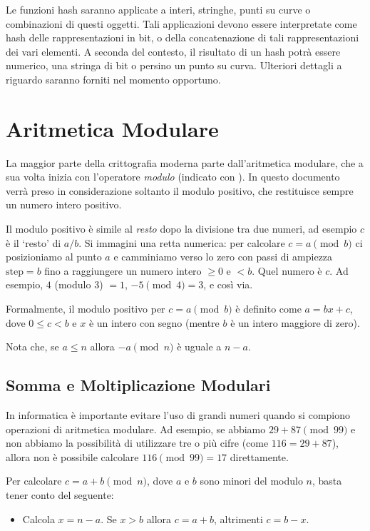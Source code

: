 Le funzioni hash saranno applicate a interi, stringhe, punti su curve o combinazioni di questi oggetti. Tali applicazioni devono essere interpretate come hash delle rappresentazioni in bit, o della concatenazione di tali rappresentazioni dei vari elementi. A seconda del contesto, il risultato di un hash potrà essere numerico, una stringa di bit o persino un punto su curva. Ulteriori dettagli a riguardo saranno forniti nel momento opportuno.



\section{Aritmetica Modulare}
\label{sec:modular-arithmetic}

La maggior parte della crittografia moderna parte dall'aritmetica modulare, che a sua volta inizia con l'operatore \emph{modulo} (indicato con ). In questo documento verrà preso in considerazione soltanto il modulo positivo, che restituisce sempre un numero intero positivo.

Il modulo positivo è simile al \emph{resto} dopo la divisione tra due numeri, ad esempio $c$ è il `resto' di $a/b$. Si immagini una retta numerica: per calcolare $c = a \pmod b$ ci posizioniamo al punto $a$ e camminiamo verso lo zero con passi di ampiezza $\text{step} = b$ fino a raggiungere un numero intero $\geq{0}$ e $<b$. Quel numero è $c$. Ad esempio, $4$ (modulo 3) $= 1$, $-5 \pmod 4 = 3$, e così via.

Formalmente, il modulo positivo per $c = a \pmod b$ è definito come $a=bx+c$, dove $0\leq{c}<{b}$ e $x$ è un intero con segno (mentre $b$ è un intero maggiore di zero).

Nota che, se $a \leq n$ allora $-a \pmod n$ è uguale a $n - a$.


\subsection{Somma e Moltiplicazione Modulari}
\label{subsec:modular-addition-multiplication}

In informatica è importante evitare l'uso di grandi numeri quando si compiono operazioni di aritmetica modulare. Ad esempio, se abbiamo $29+87 \pmod{99}$ e non abbiamo la possibilità di utilizzare tre o più cifre (come $116 = 29+87$), allora non è possibile calcolare $116 \pmod{99} = 17$ direttamente.

Per calcolare $c = a+b \pmod n$, dove $a$ e $b$ sono minori del modulo $n$, basta tener conto del seguente:
\begin{itemize}
	\item Calcola $x = n-a$. Se $x > b$ allora $c = a+b$, altrimenti $c = b - x$.
\end{itemize}

